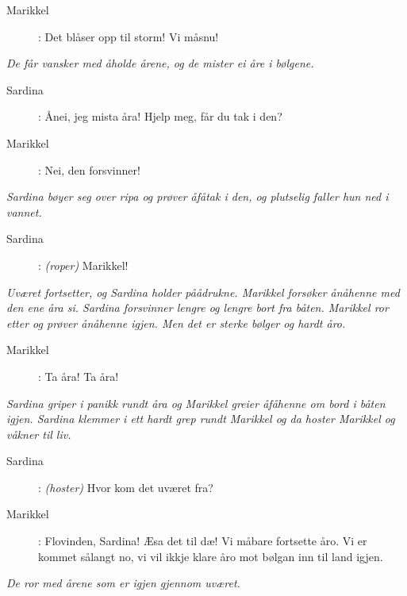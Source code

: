 {\begin{description}
\item[Marikkel]: Det bl\aa ser opp til storm! Vi m\aa  snu! 
\end{description}

\noindent \textit{\color{gray} De f\aa r vansker med \aa  holde \aa rene, og de mister ei \aa re i b\o{}lgene.}

\begin{description}
\item[Sardina]: \AA  nei, jeg mista \aa ra! Hjelp meg, f\aa r du tak i den? 
\item[Marikkel]: Nei, den forsvinner!
\end{description}

\noindent \textit{\color{gray} Sardina b\o{}yer seg over ripa og pr\o{}ver \aa  f\aa  tak i den, og plutselig faller hun ned i vannet.}

\begin{description}
\item[Sardina]:  \textit{\color{gray} (roper)} Marikkel! 
\end{description}

\noindent \textit{\color{gray} Uv\ae ret fortsetter, og Sardina holder p\aa  \aa  drukne. Marikkel fors\o{}ker \aa  n\aa  henne med den ene \aa ra si. Sardina forsvinner lengre og lengre bort fra b\aa ten. Marikkel ror etter og pr\o{}ver \aa  n\aa  henne igjen. Men det er sterke b\o{}lger og hardt \aa  ro.}

\begin{description}
\item[Marikkel]: Ta \aa ra! Ta \aa ra!
\end{description}

\noindent \textit{\color{gray} Sardina griper i panikk rundt \aa ra og Marikkel greier \aa  f\aa  henne om bord i b\aa ten igjen. Sardina klemmer i ett hardt grep rundt Marikkel og da hoster Marikkel og v\aa kner til liv.}

\begin{description}
\item[Sardina]:  \textit{\color{gray} (hoster)} Hvor kom det uv\ae ret fra? 
\item[Marikkel]: Flovinden, Sardina! \AE  sa det til d\ae ! Vi m\aa  bare fortsette \aa  ro. Vi er kommet s\aa  langt no, vi vil ikkje klare \aa  ro mot b\o{}lgan inn til land igjen. 
\end{description}

\noindent \textit{\color{gray} De ror med \aa rene som er igjen gjennom uv\ae ret.}

}
